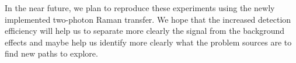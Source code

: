 In the near future, we plan to reproduce these experiments using the newly implemented two-photon Raman transfer. We hope that the increased detection efficiency will help us to separate more clearly the signal from the background effects and maybe help us identify more clearly what the problem sources are to find new paths to explore. 